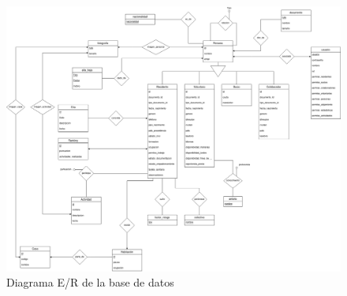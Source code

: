 \begin{figure}[hp!]
    \centering
    \includegraphics[width=\textwidth]{diseno/base_de_datos/ER.png}
    \caption{Diagrama E/R de la base de datos}
    \label{fig:er}
\end{figure}
